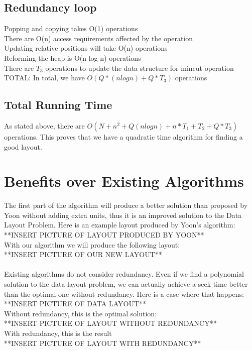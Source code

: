 \documentclass[11pt,psfig]{article}
\begin{document}
\subsection*{Redundancy loop}
	Popping and copying takes O(1) operations\\
	There are O(n) access requirements affected by the operation\\
		Updating relative positions will take O(n) operations\\
	Reforming the heap is O(n log n) operations\\
	There are $T_3$ operations to update the data structure for mincut operation\\
	TOTAL: In total, we have $O(Q*(n log n) + Q*T_3)$ operations\\

\subsection*{Total Running Time}
	As stated above, there are $O(N + n^2 + Q(n logn) + n*T_1 + T_2 + Q*T_3 )$ operations. This proves that we have a quadratic time algorithm for finding a good layout.\\

\section*{Benefits over Existing Algorithms}

The first part of the algorithm will produce a better solution than proposed by Yoon without adding extra units, thus it is an improved solution to the Data Layout Problem. Here is an example layout produced by Yoon's algorithm:\\
**INSERT PICTURE OF LAYOUT PRODUCED BY YOON**\\
With our algorithm we will produce the following layout: \\
**INSERT PICTURE OF OUR NEW LAYOUT**\\
\\
Existing algorithms do not consider redundancy. Even if we find a polynomial solution to the data layout problem, we can actually achieve a seek time better than the optimal one without redundancy. Here is a case where that happens:\\
**INSERT PICTURE OF DATA LAYOUT**\\
Without redundancy, this is the optimal solution:\\
**INSERT PICTURE OF LAYOUT WITHOUT REDUNDANCY**\\
With redundancy, this is the result\\
**INSERT PICTURE OF LAYOUT WITH REDUNDANCY**\\
\end{document}
